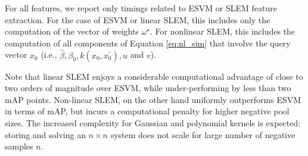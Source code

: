 For all features, we report only timings related to ESVM or SLEM feature extraction. For the case of ESVM or linear SLEM, this includes only the computation of the vector of weights $\omega^\star$. For nonlinear SLEM, this includes the computation of all components of Equation \eqref{eq:nl_sim} that involve the query vector $x_0$ (i.e., $\hat \beta, \beta_0, k(x_0, x_0^\prime), u$ and $v$). 

Note that linear SLEM enjoys a considerable computational advantage of close to two orders of magnitude over ESVM, while under-performing by less than two mAP points. Non-linear SLEM, on the other hand uniformly outperforms ESVM in terms of mAP, but incurs a computational penalty for higher negative pool sizes. The increased complexity for Gaussian and polynomial kernels is expected: storing and solving an $n\times n$ system does not scale for large number of negative samples $n$.




\vspace{3 mm}






